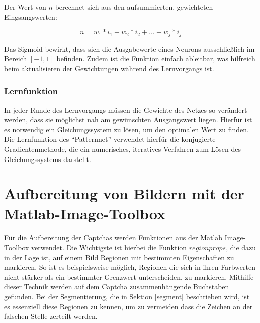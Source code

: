 Der Wert von $n$ berechnet sich aus den aufsummierten, gewichteten
Eingsangswerten:

\begin{equation}
  n = w_1 * i_1 + w_2 * i_2 + \ldots  + w_j * i_j
\end{equation}

Das Sigmoid bewirkt, dass sich die Ausgabewerte eines Neurons ausschließlich
im Bereich $[-1,1]$ befinden. Zudem ist die Funktion einfach ableitbar, was
hilfreich beim aktualisieren der Gewichtungen während des Lernvorgangs ist.

\subsubsection{Lernfunktion}

In jeder Runde des Lernvorgangs müssen die Gewichte des Netzes so verändert werden,
dass sie möglichst nah am gewünschten Ausgangswert liegen. Hierfür ist es
notwendig ein Gleichungssystem zu lösen, um den optimalen Wert zu finden. Die Lernfunktion
des ``Patternnet'' verwendet hierfür die konjugierte Gradientenmethode, die ein
numerisches, iteratives Verfahren zum Lösen des Gleichungssystems darstellt.


\section{Aufbereitung von Bildern mit der Matlab-Image-Toolbox}
\label{images}

Für die Aufbereitung der Captchas werden Funktionen aus der Matlab
Image-Toolbox verwendet. Die Wichtigste ist hierbei die Funktion $regionprops$,
die dazu in der Lage ist, auf einem Bild Regionen mit bestimmten Eigenschaften
zu markieren. So ist es beispielsweise möglich, Regionen die sich in ihren Farbwerten 
nicht stärker als ein bestimmter Grenzwert unterscheiden, zu markieren.
Mithilfe dieser Technik werden auf dem Captcha zusammenhängende Buchstaben 
gefunden. Bei der Segmentierung, die in Sektion \ref{segment} beschrieben wird,
ist es essenziell diese Regionen zu kennen, um zu vermeiden dass die Zeichen an
der falschen Stelle zerteilt werden.

